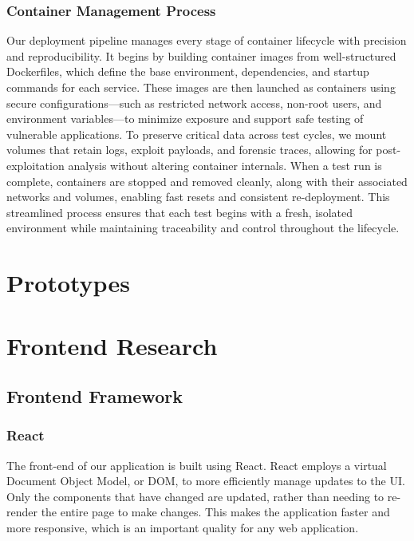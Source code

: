 \documentclass[12pt,titlepage]{article}
\begin{document}
\subsubsection{Container Management Process}
Our deployment pipeline manages every stage of container lifecycle with precision and reproducibility. It begins by building container images from well-structured Dockerfiles, which define the base environment, dependencies, and startup commands for each service. These images are then launched as containers using secure configurations—such as restricted network access, non-root users, and environment variables—to minimize exposure and support safe testing of vulnerable applications. To preserve critical data across test cycles, we mount volumes that retain logs, exploit payloads, and forensic traces, allowing for post-exploitation analysis without altering container internals. When a test run is complete, containers are stopped and removed cleanly, along with their associated networks and volumes, enabling fast resets and consistent re-deployment. This streamlined process ensures that each test begins with a fresh, isolated environment while maintaining traceability and control throughout the lifecycle.

\section{Prototypes}


\section{Frontend Research}
\subsection{Frontend Framework}
\subsubsection{React}
The front-end of our application is built using React. React employs a virtual Document Object Model, or DOM, to more efficiently manage updates to the UI. Only the components that have changed are updated, rather than needing to re-render the entire page to make changes. This makes the application faster and more responsive, which is an important quality for any web application.
\end{document}
